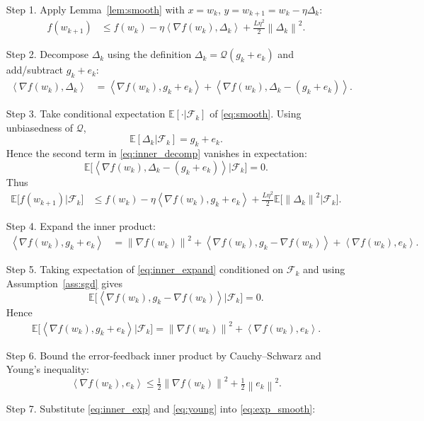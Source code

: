 \documentclass{article}
\newcommand{\E}{\mathbb{E}}
\newcommand{\norm}[1]{\left\|#1\right\|}
\newcommand{\inner}[2]{\left\langle #1,#2\right\rangle}
\newcommand{\Q}{\mathcal{Q}}
\begin{document}
\begin{enumerate}
\item[Step 1.] Apply Lemma~\ref{lem:smooth} with $x=w_k$, $y=w_{k+1}=w_k-\eta\Delta_k$:
\begin{align}
f(w_{k+1})
&\le f(w_k)-\eta\inner{\nabla f(w_k)}{\Delta_k}
      +\frac{L\eta^{2}}{2}\norm{\Delta_k}^{2}. \label{eq:smooth}
\end{align}
\item[Step 2.] Decompose $\Delta_k$ using the definition $\Delta_k=\Q(g_k+e_k)$ and add/subtract $g_k+e_k$:
\begin{align}
\inner{\nabla f(w_k)}{\Delta_k}
&=\inner{\nabla f(w_k)}{g_k+e_k}
  +\inner{\nabla f(w_k)}{\Delta_k-(g_k+e_k)}. \label{eq:inner_decomp}
\end{align}
\item[Step 3.] Take conditional expectation $\E[\cdot|\mathcal{F}_k]$ of \eqref{eq:smooth}. Using unbiasedness of $\Q$,
\[
\E[\Delta_k|\mathcal{F}_k]=g_k+e_k.
\]
Hence the second term in \eqref{eq:inner_decomp} vanishes in expectation:
\[
\E\!\big[\inner{\nabla f(w_k)}{\Delta_k-(g_k+e_k)}\big|\mathcal{F}_k\big]=0.
\]
Thus
\begin{align}
\E\!\big[f(w_{k+1})\big|\mathcal{F}_k\big]
&\le f(w_k)-\eta\inner{\nabla f(w_k)}{g_k+e_k}
   +\frac{L\eta^{2}}{2}\E\!\big[\norm{\Delta_k}^{2}\big|\mathcal{F}_k\big]. \label{eq:exp_smooth}
\end{align}
\item[Step 4.] Expand the inner product:
\begin{align}
\inner{\nabla f(w_k)}{g_k+e_k}
&= \norm{\nabla f(w_k)}^{2}
   +\inner{\nabla f(w_k)}{g_k-\nabla f(w_k)}
   +\inner{\nabla f(w_k)}{e_k}. \label{eq:inner_expand}
\end{align}
\item[Step 5.] Taking expectation of \eqref{eq:inner_expand} conditioned on $\mathcal{F}_k$ and using Assumption~\ref{ass:sgd} gives
\[
\E\!\big[\inner{\nabla f(w_k)}{g_k-\nabla f(w_k)}\big|\mathcal{F}_k\big]=0.
\]
Hence
\begin{align}
\E\!\big[\inner{\nabla f(w_k)}{g_k+e_k}\big|\mathcal{F}_k\big]
= \norm{\nabla f(w_k)}^{2}
  +\inner{\nabla f(w_k)}{e_k}. \label{eq:inner_exp}
\end{align}
\item[Step 6.] Bound the error‑feedback inner product by Cauchy–Schwarz and Young’s inequality:
\[
\inner{\nabla f(w_k)}{e_k}
\le \tfrac{1}{2}\norm{\nabla f(w_k)}^{2}
   +\tfrac{1}{2}\norm{e_k}^{2}. \label{eq:young}
\]
\item[Step 7.] Substitute \eqref{eq:inner_exp} and \eqref{eq:young} into \eqref{eq:exp_smooth}:

\end{enumerate}
\end{document}
